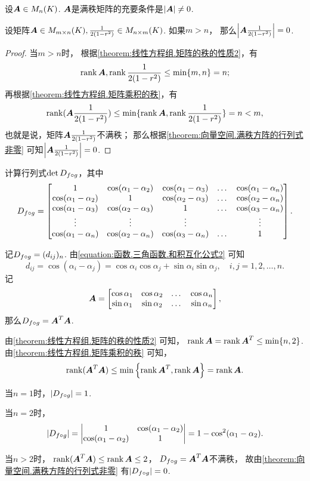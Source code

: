 \begin{theorem}\label{theorem:向量空间.满秩方阵的行列式非零}
设\(\boldsymbol{A}\in M_n(K)\).
\(\boldsymbol{A}\)是满秩矩阵的充要条件是\(\abs{\boldsymbol{A}}\neq0\).
\end{theorem}

\begin{corollary}
设矩阵\(\boldsymbol{A} \in M_{m \times n}(K),
\frac{1}{2(1-r^2)} \in M_{n \times m}(K)\).
如果\(m > n\)，
那么\(\abs{\boldsymbol{A}\frac{1}{2(1-r^2)}} = 0\).
\begin{proof}
当\(m>n\)时，
根据\cref{theorem:线性方程组.矩阵的秩的性质2}，有\[
	\rank\boldsymbol{A},\rank\frac{1}{2(1-r^2)} \leq \min\{m,n\} = n;
\]
再根据\cref{theorem:线性方程组.矩阵乘积的秩}，有\[
	\rank(\boldsymbol{A}\frac{1}{2(1-r^2)}) \leq \min\{\rank\boldsymbol{A},\rank\frac{1}{2(1-r^2)}\} = n < m,
\]
也就是说，矩阵\(\boldsymbol{A}\frac{1}{2(1-r^2)}\)不满秩；
那么根据\cref{theorem:向量空间.满秩方阵的行列式非零} 可知\(\abs{\boldsymbol{A}\frac{1}{2(1-r^2)}} = 0\).
\end{proof}
\end{corollary}

\begin{example}
计算行列式\(\det D_{f \circ g}\)，其中\[
D_{f \circ g} = \begin{bmatrix}
	1 & \cos(\alpha_1-\alpha_2) & \cos(\alpha_1-\alpha_3) & \dots & \cos(\alpha_1-\alpha_n) \\
	\cos(\alpha_1-\alpha_2) & 1 & \cos(\alpha_2-\alpha_3) & \dots & \cos(\alpha_2-\alpha_n) \\
	\cos(\alpha_1-\alpha_3) & \cos(\alpha_2-\alpha_3) & 1 & \dots & \cos(\alpha_3-\alpha_n) \\
	\vdots & \vdots & \vdots & & \vdots \\
	\cos(\alpha_1-\alpha_n) & \cos(\alpha_2-\alpha_n) & \cos(\alpha_3-\alpha_n) & \dots & 1
\end{bmatrix}.
\]
\begin{solution}
记\(D_{f \circ g} = (d_{ij})_n\).
由\cref{equation:函数.三角函数.和积互化公式2} 可知\[
	d_{ij} = \cos(\alpha_i-\alpha_j)
	= \cos\alpha_i\cos\alpha_j+\sin\alpha_i\sin\alpha_j,
	\quad i,j=1,2,\dotsc,n.
\]
记\[
	\boldsymbol{A} = \begin{bmatrix}
		\cos\alpha_1 & \cos\alpha_2 & \dots & \cos\alpha_n \\
		\sin\alpha_1 & \sin\alpha_2 & \dots & \sin\alpha_n
	\end{bmatrix},
\]那么\(D_{f \circ g} = \boldsymbol{A}^T \boldsymbol{A}\).

由\cref{theorem:线性方程组.矩阵的秩的性质2} 可知，
\(\rank\boldsymbol{A} = \rank\boldsymbol{A}^T \leq \min\{n,2\}\).
由\cref{theorem:线性方程组.矩阵乘积的秩} 可知，\[
	\rank(\boldsymbol{A}^T\boldsymbol{A}) \leq \min\left\{\rank\boldsymbol{A}^T,\rank\boldsymbol{A}\right\} = \rank\boldsymbol{A}.
\]

当\(n=1\)时，\(\abs{D_{f \circ g}}=1\).

当\(n=2\)时，\[
	\abs{D_{f \circ g}}
	= \begin{vmatrix}
		1 & \cos(\alpha_1-\alpha_2) \\
		\cos(\alpha_1-\alpha_2) & 1
	\end{vmatrix}
	= 1 - \cos^2(\alpha_1-\alpha_2).
\]

当\(n>2\)时，
\(\rank(\boldsymbol{A}^T\boldsymbol{A}) \leq \rank\boldsymbol{A} \leq2\)，
\(D_{f \circ g} = \boldsymbol{A}^T \boldsymbol{A}\)不满秩，
故由\cref{theorem:向量空间.满秩方阵的行列式非零} 有\(\abs{D_{f \circ g}}=0\).
\end{solution}
\end{example}

